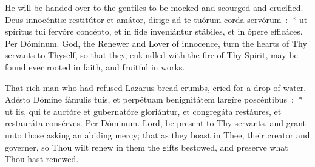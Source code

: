 {{  %
  

  
  {He will be handed over to the gentiles to be mocked and scourged and crucified.}
  {Deus innocéntiæ restitútor et amátor, dírige ad te tuórum corda servórum~:~* ut spíritus tui fervóre concépto, et in fide inveniántur stábiles, et in ópere efficáces. Per Dóminum.}
  {God, the Renewer and Lover of innocence, turn the hearts of Thy servants to Thyself, so that they, enkindled with the fire of Thy Spirit, may be found ever rooted in faith, and fruitful in works.}

  {That rich man who had refused Lazarus bread-crumbs, cried for a drop of water.}
  {Adésto Dómine fámulis tuis, et perpétuam benignitátem largíre poscéntibus~:~* ut iis, qui te auctóre et gubernatóre gloriántur, et congregáta restáures, et restauráta consérves. Per Dóminum.}
  {Lord, be present to Thy servants, and grant unto those asking an abiding mercy; that as they boast in Thee, their creator and governer, so Thou wilt renew in them the gifts bestowed, and preserve what Thou hast renewed.}

}}
